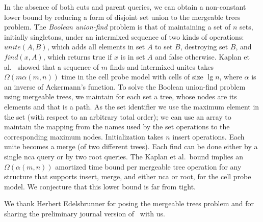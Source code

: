 \documentclass[twoside,leqno,twocolumn]{article}
\begin{document}
In the absence of both cuts and parent queries, we can obtain a non-constant lower bound by reducing a form of disjoint set union to the mergeable trees problem.  The \emph{Boolean union-find} problem is that of maintaining a set of $n$ sets, initially singletons, under an intermixed sequence of two kinds of operations: $\mathit{unite}(A, B)$, which adds all elements in set $A$ to set $B$, destroying set $B$, and $\mathit{find}(x, A)$, which returns true if $x$ is in set $A$ and false otherwise.  Kaplan et al.~\cite{KST02} showed that a sequence of $m$ finds and intermixed unites takes $\Omega(m \alpha(m, n))$ time in the cell probe model with cells of size $\lg n$, where $\alpha$ is an inverse of Ackermann's function.  To solve the Boolean union-find problem using mergeable trees, we maintain for each set a tree, whose nodes are its elements and that is a path.  As the set identifier we use the maximum element in the set (with respect to an arbitrary total order); we can use an array to maintain the mapping from the names used by the set operations to the corresponding maximum nodes.  Initialization takes $n$ insert operations.  Each unite becomes a merge (of two different trees).  Each find can be done either by a single nca query or by two root queries.  The Kaplan et al.\ bound implies an $\Omega(\alpha(m, n))$ amortized time bound per mergeable tree operation for any structure that supports insert, merge, and either nca or root, for the cell probe model.  We conjecture that this lower bound is far from tight.


\vspace{.2cm}
 We thank Herbert Edelsbrunner for posing the mergeable trees problem and for sharing the preliminary journal version of~\cite{AEHW04} with us.



\end{document}
